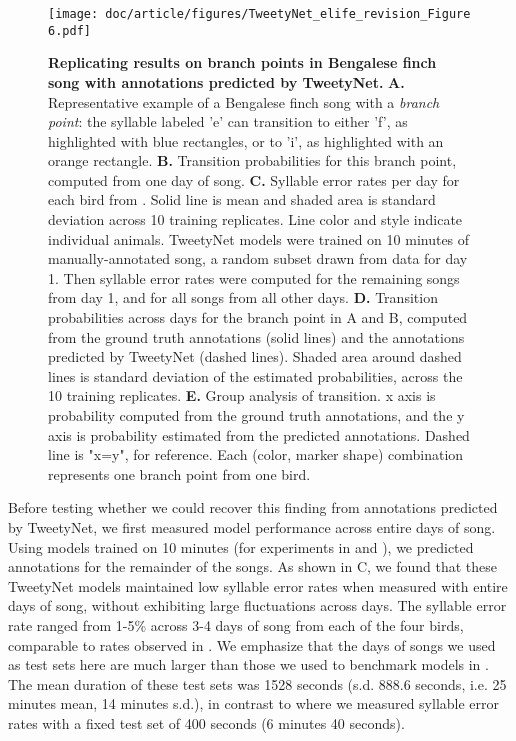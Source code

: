 \documentclass[9pt,lineno]{elife}
\begin{document}
\begin{figure}%
\texttt{[image: doc/article/figures/TweetyNet\_elife\_revision\_Figure 6.pdf]}
\caption{{\bf Replicating results on branch points in Bengalese finch song with annotations predicted by TweetyNet.}
\textbf{A.} Representative example of a Bengalese finch song with a \textit{branch point}: 
the syllable labeled 'e' can transition to either 'f', as highlighted 
with blue rectangles, or to 'i', as highlighted with an orange rectangle.
\textbf{B.} Transition probabilities for this branch point, computed from one day of song.
\textbf{C.} Syllable error rates per day for each bird from \cite{nicholson_bengalese_2017}. 
Solid line is mean and shaded area is standard deviation across 10 training replicates. 
Line color and style indicate individual animals. 
TweetyNet models were trained on 10 minutes of 
manually-annotated song, a random subset drawn from data for day 1. 
Then syllable error rates were computed for the remaining songs  
from day 1, and for all songs from all other days.
\textbf{D.} Transition probabilities across days  
for the branch point in A and B,  
computed from the ground truth annotations (solid lines) 
and the annotations predicted by TweetyNet (dashed lines). 
Shaded area around dashed lines is standard deviation 
of the estimated probabilities, across the 10 training replicates.
\textbf{E.} Group analysis of transition.
x axis is probability computed from the ground truth annotations, and the 
y axis is probability estimated from the predicted annotations. 
Dashed line is "x=y", for reference.
Each (color, marker shape) combination represents one branch point from one bird. 
}
\label{fig:bf-behavior}
\label{figdata:first}
\label{figdata:second}
\label{figdata:third}
\end{figure}

Before testing whether we could recover this finding from annotations predicted by TweetyNet, 
we first measured model performance across entire days of song. 
Using models trained on 10 minutes 
(for experiments in  and ), 
we predicted annotations for the remainder of the songs.
As shown in C, 
we found that these TweetyNet models maintained low syllable error rates when measured with entire days of song, 
without exhibiting large fluctuations across days.
The syllable error rate ranged from 1-5\% across 3-4 days of song from each of the four birds, 
comparable to rates observed in .
We emphasize that the days of songs we used as test sets here 
are much larger than those we used to benchmark models in .
The mean duration of these test sets was 1528 seconds 
(s.d. 888.6 seconds, i.e. 25 minutes mean, 14 minutes s.d.),
in contrast to  where we measured syllable error rates with 
a fixed test set of 400 seconds (6 minutes 40 seconds).
\end{document}
